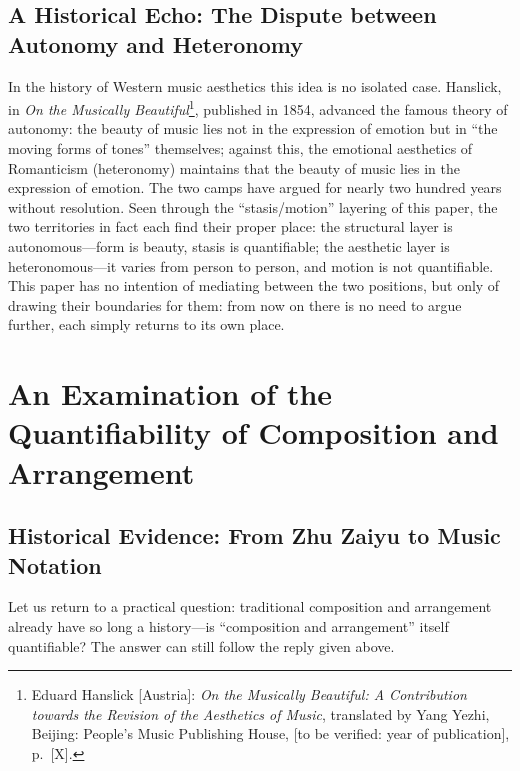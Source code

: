 \documentclass[11pt,a4paper]{article}
\begin{document}
\subsection{A Historical Echo: The Dispute between Autonomy and Heteronomy}

In the history of Western music aesthetics this idea is no isolated case. Hanslick, in
\textit{On the Musically Beautiful}\footnote{Eduard Hanslick [Austria]: \textit{On the
Musically Beautiful: A Contribution towards the Revision of the Aesthetics of Music},
translated by Yang Yezhi, Beijing: People's Music Publishing House, [to be verified: year
of publication], p.~[X].}, published in 1854, advanced the famous theory of autonomy: the
beauty of music lies not in the expression of emotion but in ``the moving forms of tones''
themselves; against this, the emotional aesthetics of Romanticism (heteronomy) maintains
that the beauty of music lies in the expression of emotion. The two camps have argued for
nearly two hundred years without resolution. Seen through the ``stasis/motion'' layering
of this paper, the two territories in fact each find their proper place: the structural
layer is autonomous---form is beauty, stasis is quantifiable; the aesthetic layer is
heteronomous---it varies from person to person, and motion is not quantifiable. This paper
has no intention of mediating between the two positions, but only of drawing their
boundaries for them: from now on there is no need to argue further, each simply returns to
its own place.

\section{An Examination of the Quantifiability of Composition and Arrangement}

\subsection{Historical Evidence: From Zhu Zaiyu to Music Notation}

Let us return to a practical question: traditional composition and arrangement already have
so long a history---is ``composition and arrangement'' itself quantifiable? The answer can
still follow the reply given above.
\end{document}
